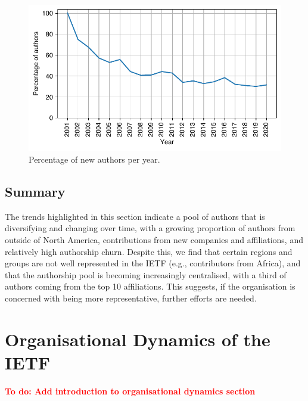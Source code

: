 \documentclass[twocolumn,10pt]{article}
\newlength{\figureWidthOneColumn}
\newcommand{\todo}[1]{\textbf{\textcolor{red}{To do: #1}}}
\begin{document}
\begin{figure}
  \centering
  \includegraphics[width=\figureWidthOneColumn]{figures-prev/imc-2021/authors/repeat_authors.pdf}
  \caption{
    Percentage of new authors per year.
  }
  \label{fig:author_new}
\end{figure}

\subsection{Summary}
The trends highlighted in this section  indicate a pool of authors that is
diversifying and changing over time, with a growing proportion of authors
from outside of North America, contributions from new companies and
affiliations, and relatively high authorship churn. Despite this, we find
that certain regions and groups are not well represented in the IETF (e.g.,
contributors from Africa), and that the authorship pool is becoming
increasingly centralised, with a third of authors coming from the top 10
affiliations. This suggests, if the organisation is concerned with being
more representative, further efforts are needed.


\section{Organisational Dynamics of the IETF}
\label{sec:org-dynamics}

\todo{Add introduction to organisational dynamics section}

\end{document}
